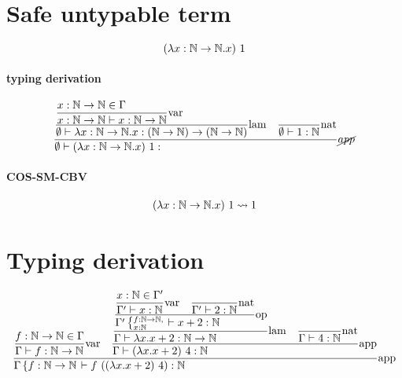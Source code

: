 \documentclass{article}
\newcommand{\st}[3][]{\ensuremath{\displaystyle\frac{#3\hfill}{#2\hfill} \text{#1}}}
\newcommand{\N}{\ensuremath \mathbb N}
\newcommand{\lam}[2]{\ensuremath{\lambda#1.#2}}
\begin{document}

\section{Safe untypable term}
\begin{equation*}
    (\lam{x:\N\to\N}{x})\ 1
\end{equation*}

\paragraph{typing derivation}
\begin{align*}
    \st[$\cancel{app}$]{
        \emptyset\vdash (\lam{x:\N\to\N}{x})\ 1: 
    }{
        \st[lam]{
            \emptyset\vdash\lam{x:\N\to\N}{x}:(\N\to\N)\to(\N\to\N)
        }{
            \st[var]{
                x:\N\to\N\vdash x:\N\to\N
            }{
                x:\N\to\N\in\Gamma
            }
        }
        \quad
        \st[nat]{
            \emptyset\vdash 1:\N
        }{}
    }
\end{align*}

\paragraph{COS-SM-CBV}
\begin{align*}
    (\lam{x:\N\to\N}{x})\ 1 \leadsto 1
\end{align*}

\section{Typing derivation}
\begin{equation*}
    \st[app]{
        \Gamma\left\{f:\N\to\N\right. \vdash f\ ((\lam{x}{x+2})\ 4): \N
    }{
        \st[var]{
            \Gamma \vdash f:\N\to\N
        }{
            f:\N\to\N \in \Gamma
        }
        \quad
        \st[app]{
            \Gamma\vdash (\lam{x}{x+2})\ 4: \N
        }{
            \st[lam]{
                \Gamma\vdash \lam{x}{x+2}:\N\to\N
            }{
                \st[op]{
                    \Gamma'\left\{\substack{f:\N\to\N\hfill,\\x:\N\hfill}\right.\vdash x+2:\N
                }{
                    \st[var]{
                        \Gamma'\vdash x:\N
                    }{
                        x:\N\in\Gamma'
                    }
                    \quad
                    \st[nat]{
                        \Gamma'\vdash 2:\N
                    }{
                    }
                }
            }
            \quad
            \st[nat]{
                \Gamma\vdash 4:\N
            }{}
        }
    }
\end{equation*}
\end{document}
